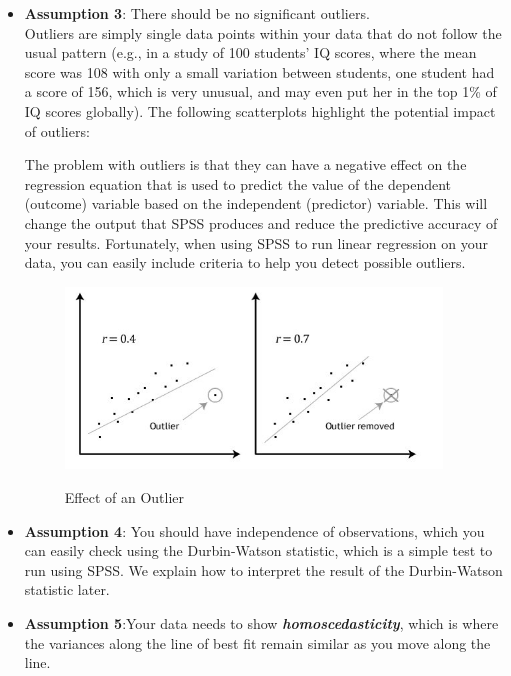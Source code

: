 \documentclass[11pt]{article} %
\begin{document}
\begin{itemize}
\item \textbf{Assumption 3}: There should be no significant outliers.\\ Outliers are simply single data points within your data that do not follow the usual pattern (e.g., in a study of 100 students’ IQ scores, where the mean score was 108 with only a small variation between students, one student had a score of 156, which is very unusual, and may even put her in the top 1\% of IQ scores globally). The following scatterplots highlight the potential impact of outliers:

The problem with outliers is that they can have a negative effect on the regression equation that is used to predict the value of the dependent (outcome) variable based on the independent (predictor) variable. This will change the output that SPSS produces and reduce the predictive accuracy of your results. Fortunately, when using SPSS to run linear regression on your data, you can easily include criteria to help you detect possible outliers.
\begin{figure}[h!]
\begin{centering}
  \includegraphics[width=10cm]{Regre2.jpg}\\
  \caption{Effect of an Outlier}
\end{centering}
\end{figure}
\item \textbf{Assumption 4}: You should have independence of observations, which you can easily check using the Durbin-Watson statistic, which is a simple test to run using SPSS. We explain how to interpret the result of the Durbin-Watson statistic later.

\item \textbf{Assumption 5}:Your data needs to show \textbf{\textit{homoscedasticity}}, which is where the variances along the line of best fit remain similar as you move along the line. 


\end{itemize}
\end{document}
